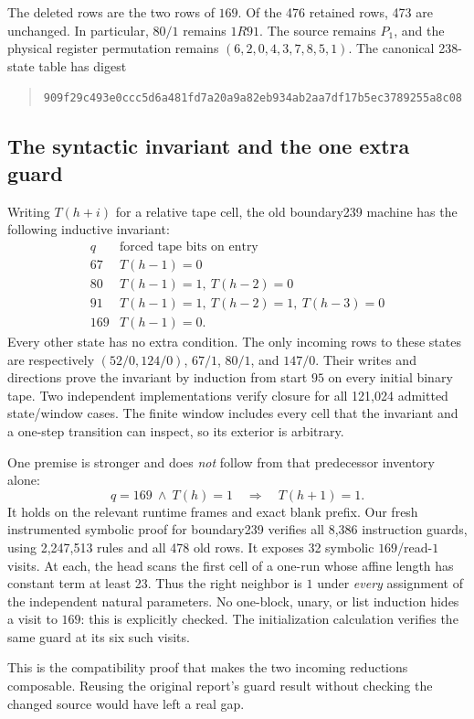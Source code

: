 \documentclass[11pt,letterpaper]{article}
\theoremstyle{definition}\newtheorem{definition}[theorem]{Definition}
\newcommand{\hash}[1]{\begin{quote}\footnotesize\expandafter\nolinkurl\expandafter{#1}\end{quote}}
\begin{document}
The deleted rows are the two rows of $169$.  Of the 476 retained rows,
473 are unchanged.  In particular, $80/1$ remains $1R91$.  The source
remains $P_1$, and the physical register permutation remains
$(6,2,0,4,3,7,8,5,1)$.  The canonical 238-state table has digest
\hash{909f29c493e0ccc5d6a481fd7a20a9a82eb934ab2aa7df17b5ec3789255a8c08}

\subsection{The syntactic invariant and the one extra guard}

Writing $T(h+i)$ for a relative tape cell, the old boundary239 machine
has the following inductive invariant:
\[
\begin{array}{c|l}
q & \text{forced tape bits on entry}\\\hline
67&T(h-1)=0\\
80&T(h-1)=1,\ T(h-2)=0\\
91&T(h-1)=1,\ T(h-2)=1,\ T(h-3)=0\\
169&T(h-1)=0.
\end{array}
\]
Every other state has no extra condition.  The only incoming rows to these
states are respectively $(52/0,124/0)$, $67/1$, $80/1$, and $147/0$.
Their writes and directions prove the invariant by induction from start
$95$ on every initial binary tape.  Two independent implementations
verify closure for all 121,024 admitted state/window cases.  The finite
window includes every cell that the invariant and a one-step transition
can inspect, so its exterior is arbitrary.

One premise is stronger and does \emph{not} follow from that predecessor
inventory alone:
\[
 q=169\ \wedge\ T(h)=1 \quad\Longrightarrow\quad T(h+1)=1.
 \tag{G169}
\]
It holds on the relevant runtime frames and exact blank prefix.  Our fresh
instrumented symbolic proof for boundary239 verifies all 8,386 instruction
guards, using 2,247,513 rules and all 478 old rows.  It exposes 32 symbolic
$169$/read-$1$ visits.  At each, the head scans the first cell of a one-run
whose affine length has constant term at least 23.  Thus the right neighbor
is $1$ under \emph{every} assignment of the independent natural parameters.
No one-block, unary, or list induction hides a visit to $169$: this is
explicitly checked.  The initialization calculation verifies the same
guard at its six such visits.

This is the compatibility proof that makes the two incoming reductions
composable.  Reusing the original report's guard result without checking
the changed source would have left a real gap.
\end{document}
